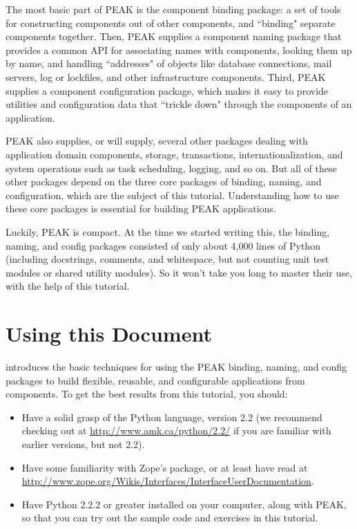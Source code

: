 The most basic part of PEAK is the component binding package: a set of
tools for constructing components out of other components, and ``binding"
separate components together. Then, PEAK supplies a component naming
package that provides a common API for associating names with
components, looking them up by name, and handling ``addresses" of objects
like database connections, mail servers, log or lockfiles, and other
infrastructure components. Third, PEAK supplies a component
configuration package, which makes it easy to provide utilities and
configuration data that ``trickle down" through the components of an
application.

PEAK also supplies, or will supply, several other packages dealing with
application domain components, storage, transactions,
internationalization, and system operations such as task scheduling,
logging, and so on. But all of these other packages depend on the three
core packages of binding, naming, and configuration, which are the
subject of this tutorial.  Understanding how to use these core packages
is essential for building PEAK applications.

Luckily, PEAK is compact. At the time we started writing this, the binding,
naming, and config packages consisted of only about 4,000 lines of Python
(including docstrings, comments, and whitespace, but not counting unit
test modules or shared utility modules). So it won't take you long to
master their use, with the help of this tutorial.

\newpage


\section{Using this Document}

 introduces
the basic techniques for using the PEAK binding, naming, and config
packages to build flexible, reusable, and configurable applications from
components. To get the best results from this tutorial, you should:

\begin{itemize}

\item Have a solid grasp of the Python language, version 2.2 (we
recommend checking out  at
\url{http://www.amk.ca/python/2.2/} if you are familiar with earlier
versions, but not 2.2).

\item Have some familiarity with Zope's  package, or at least
have read  at
\url{http://www.zope.org/Wikis/Interfaces/InterfaceUserDocumentation}.

\item Have Python 2.2.2 or greater installed on your computer, along
with PEAK, so that you can try out the sample code and exercises in this
tutorial.

\end{itemize}

